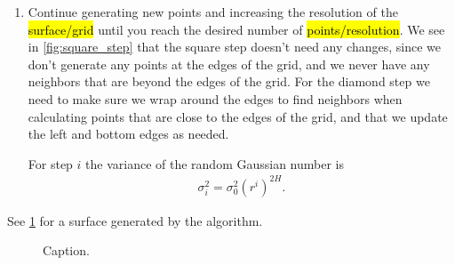 \begin{enumerate}
    

    \item Continue generating new points and increasing the resolution of the \hl{surface/grid} until you reach the desired number of \hl{points/resolution}. We see in \cref{fig:square_step} that the square step doesn't need any changes, since we don't generate any points at the edges of the grid, and we never have any neighbors that are beyond the edges of the grid. For the diamond step we need to make sure we wrap around the edges to find neighbors when calculating points that are close to the edges of the grid, and that we update the left and bottom edges as needed. 
    
    For step $i$ the variance of the random Gaussian number is
    \begin{align*}
        \sigma_i^2 = \sigma_0^2(r^i)^{2H}.
    \end{align*}
\end{enumerate}

See \cref{fig:diamond_square_surface} for a surface generated by the algorithm.

\begin{figure}
    \centering
    
    \caption{
        Caption.
        \label{fig:diamond_square_surface}
    }
\end{figure}

